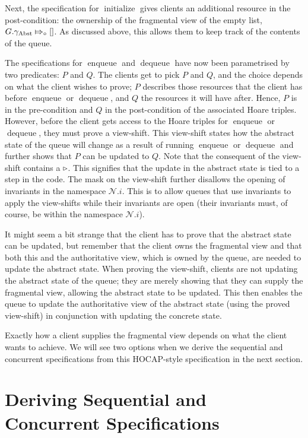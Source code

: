 \documentclass[a4paper, 10pt]{report}
\theoremstyle{definition}
\newcommand{\initialise}{\operatorname{initialize}}
\newcommand{\enqueue}{\operatorname{enqueue}}
\newcommand{\dequeue}{\operatorname{dequeue}}
\newcommand{\Qg}{G}
\newcommand{\gabst}{\gname_{\mathrm{Abst}}}
\newcommand{\Nl}{\ensuremath{\mathcal{N}}}
\newcommand{\abstractstatefullfrag}[2]{#1 \Mapsto_{\circ} #2}
\begin{document}
Next, the specification for $\initialise$ gives clients an additional resource in the post-condition: the ownership of the fragmental view of the empty list, $\abstractstatefullfrag{\Qg.\gabst}{[]}$. As discussed above, this allows them to keep track of the contents of the queue.

The specifications for $\enqueue$ and $\dequeue$ have now been parametrised by two predicates: $P$ and $Q$. The clients get to pick $P$ and $Q$, and the choice depends on what the client wishes to prove; $P$ describes those resources that the client has before $\enqueue$ or $\dequeue$, and $Q$ the resources it will have after. Hence, $P$ is in the pre-condition and $Q$ in the post-condition of the associated Hoare triples. However, before the client gets access to the Hoare triples for $\enqueue$ or $\dequeue$, they must prove a view-shift. This view-shift states how the abstract state of the queue will change as a result of running $\enqueue$ or $\dequeue$ and further shows that $P$ can be updated to $Q$. Note that the consequent of the view-shift contains a $\mathop{\triangleright}$. This signifies that the update in the abstract state is tied to a step in the code. The mask on the view-shift further disallows the opening of invariants in the namespace $\Nl.i$. This is to allow queues that use invariants to apply the view-shifts while their invariants are open (their invariants must, of course, be within the namespace $\Nl.i$).

It might seem a bit strange that the client has to prove that the abstract state can be updated, but remember that the client owns the fragmental view and that both this and the authoritative view, which is owned by the queue, are needed to update the abstract state. When proving the view-shift, clients are not updating the abstract state of the queue; they are merely showing that they can supply the fragmental view, allowing the abstract state to be updated. This then enables the queue to update the authoritative view of the abstract state (using the proved view-shift) in conjunction with updating the concrete state.

Exactly how a client supplies the fragmental view depends on what the client wants to achieve. We will see two options when we derive the sequential and concurrent specifications from this HOCAP-style specification in the next section.

\section{Deriving Sequential and Concurrent Specifications}
\label{QueueSpecs:section:deriving-seq-and-conc}
\end{document}
